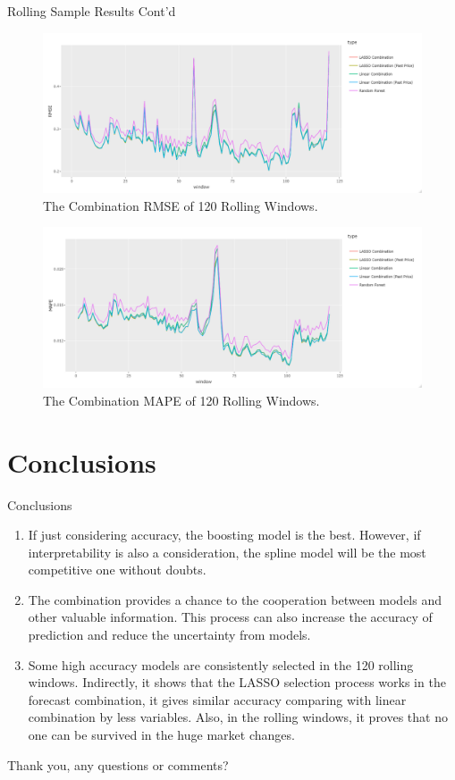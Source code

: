 \documentclass{beamer}
\begin{document}
\begin{frame}[t]{Rolling Sample Results Cont'd}
\vspace*{-\baselineskip}
\begin{figure}
\caption{The Combination RMSE of 120 Rolling Windows.}
\includegraphics[scale=0.2]{rmse_combination_rolling}
\end{figure}
\vspace*{-\baselineskip}
\begin{figure}
\caption{The Combination MAPE of 120 Rolling Windows.}
\includegraphics[scale=0.2]{mape_combination_rolling}
\end{figure}

\end{frame}


\section{Conclusions}

\begin{frame}[t]{Conclusions}

\begin{enumerate}
\item If just considering accuracy, the boosting model is the best. However, if interpretability is also a consideration, the spline model will be the most competitive one without doubts.
\item The combination provides a chance to the cooperation between models and other valuable information. This process can also increase the accuracy of prediction and reduce the uncertainty from models.
\item Some high accuracy models are consistently selected in the 120 rolling windows. Indirectly, it shows that the LASSO selection process works in the forecast combination, it gives similar accuracy comparing with linear combination by less variables. Also, in the rolling windows, it proves that no one can be survived in the huge market changes.  
\end{enumerate}

\end{frame}

\begin{frame}
\LARGE Thank you, any questions or comments?
\end{frame}
\end{document}
